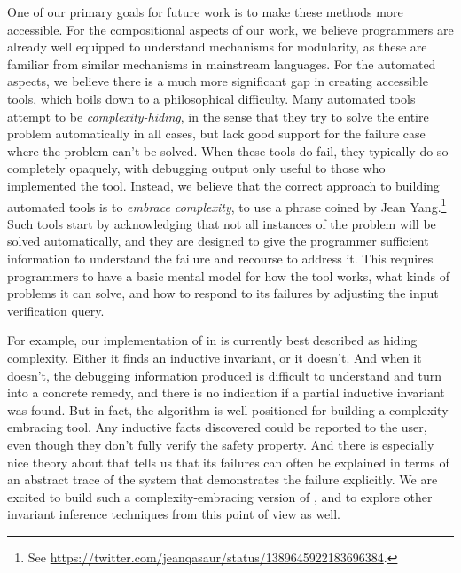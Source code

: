 One of our primary goals for future work is to make these methods more accessible.
For the compositional aspects of our work,
  we believe programmers are already well equipped to understand mechanisms for modularity,
  as these are familiar from similar mechanisms in mainstream languages.
For the automated aspects,
  we believe there is a much more significant gap in creating accessible tools,
  which boils down to a philosophical difficulty.
Many automated tools attempt to be \emph{complexity-hiding},
  in the sense that they try to solve the entire problem automatically in all cases,
  but lack good support for the failure case where the problem can't be solved.
When these tools do fail,
  they typically do so completely opaquely,
  with debugging output only useful to those who implemented the tool.
Instead, we believe that the correct approach to building automated tools
  is to \emph{embrace complexity},
  to use a phrase coined by Jean Yang.\footnote{See \url{https://twitter.com/jeanqasaur/status/1389645922183696384}.}
Such tools start by acknowledging that not all instances of the problem will be solved automatically,
  and they are designed to give the programmer
    sufficient information to understand the failure and
    recourse to address it.
This requires programmers to have a basic mental model
  for how the tool works,
  what kinds of problems it can solve, and
  how to respond to its failures by adjusting the input verification query.

For example, our implementation of \updr in \mypyvy is
  currently best described as hiding complexity.
Either it finds an inductive invariant, or it doesn't.
And when it doesn't, the debugging information produced is
  difficult to understand and turn into a concrete remedy,
  and there is no indication if a partial inductive invariant was found.
But in fact, the \updr algorithm is well positioned for building a complexity embracing tool.
Any inductive facts discovered could be reported to the user,
  even though they don't fully verify the safety property.
And there is especially nice theory about \updr that tells us that its failures
  can often be explained in terms of an abstract trace of the system
  that demonstrates the failure explicitly.
We are excited to build such a complexity-embracing version of \updr,
  and to explore other invariant inference techniques from this point of view as well.
